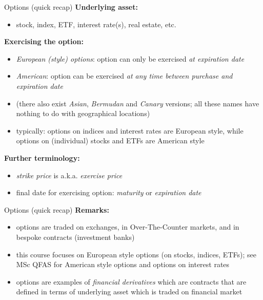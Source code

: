 \documentclass[pdf, handout]{beamer}
\begin{document}
\begin{frame}{Options (quick recap)}
\textbf{Underlying asset:}
\begin{itemize}
\item stock, index, ETF, interest rate(s), real estate, etc.
\end{itemize}
\textbf{Exercising the option:}
\begin{itemize}
\item \emph{European (style) options}: option can only be exercised \emph{at expiration date}
\item \emph{American}: option can be exercised \emph{at any time between
purchase and expiration date}
\item (there also exist \emph{Asian}, \emph{Bermudan} and \emph{Canary} versions; all these names have nothing to do with geographical locations)
\item typically: options on indices and interest rates are European style, while options on (individual) stocks and ETFs are American style
\end{itemize}
\textbf{Further terminology:}
\begin{itemize}
\item \emph{strike price} is a.k.a. \emph{exercise price}
\item final date for exercising option: \emph{maturity} or \emph{expiration date}
\end{itemize}
\end{frame}
%
\begin{frame}{Options (quick recap)}
\textbf{Remarks:}
\begin{itemize}
\item options are traded on exchanges, in Over-The-Counter markets, and in bespoke contracts (investment banks)
\item this course focuses on European style options (on stocks, indices, ETFs); see MSc QFAS for American style options and options on interest rates
\item options are examples of \emph{financial derivatives} which are contracts that are defined in terms of underlying asset which is traded on financial market
\end{itemize}
\end{frame}
\end{document}
